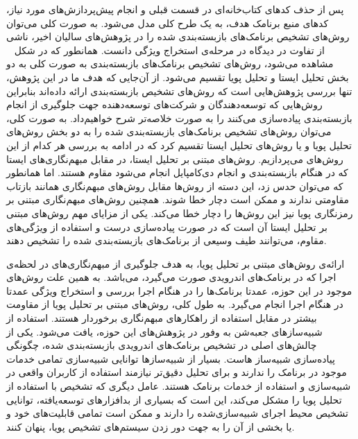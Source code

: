 پس از حذف کد‌های کتاب‌خانه‌ای در قسمت قبلی و انجام پیش‌پردازش‌های مورد نیاز، کد‌های منبع برنامک هدف، به یک طرح کلی مدل می‌شود. به صورت کلی می‌توان روش‌های تشخیص برنامک‌های بازبسته‌بندی شده را در پژوهش‌های سالیان اخیر، ناشی از تفاوت در دیدگاه در مرحله‌ی استخراج ویژگی دانست. همانطور که در شکل ~ مشاهده می‌شود، روش‌های تشخیص برنامک‌های بازبسته‌بندی به صورت کلی به دو بخش تحلیل ایستا و تحلیل پویا تقسیم می‌شود. از آن‌جایی که هدف ما در این پژوهش، تنها بررسی پژوهش‌هایی است که روش‌های تشخیص بازبسته‌بندی ارائه داده‌اند بنابراین روش‌هایی که توسعه‌دهندگان و شرکت‌های توسعه‌دهنده جهت جلوگیری از انجام بازبسته‌بندی پیاده‌سازی می‌کنند را به صورت خلاصه‌تر شرح خواهیم‌داد. به صورت کلی، می‌توان روش‌های تشخیص برنامک‌های بازبسته‌بندی شده را به دو بخش روش‌های تحلیل پویا و یا روش‌های تحلیل ایستا تقسیم کرد که در ادامه به بررسی هر کدام از این روش‌های می‌پردازیم. 
 روش‌های مبتنی بر تحلیل ایستا، در مقابل مبهم‌نگاری‌‌های ایستا که در هنگام بازبسته‌بندی و انجام دی‌کامپایل انجام می‌شود مقاوم هستند. اما همانطور که می‌توان حدس زد، این دسته از روش‌ها مقابل روش‌های مبهم‌نگاری همانند بازتاب مقاومتی ندارند و ممکن است دچار خطا شوند. همچنین روش‌های مبهم‌نگاری مبتنی بر رمز‌نگاری پویا نیز این روش‌‌ها را دچار خطا می‌کند. یکی از مزایای مهم روش‌های مبتنی بر تحلیل ایستا آن است که در صورت پیاده‌سازی درست و استفاده از ویژگی‌های مقاوم، می‌توانند طیف وسیعی از برنامک‌های بازبسته‌بندی شده را تشخیص دهند.

 ارائه‌ی روش‌های مبتنی بر تحلیل پویا، به هدف جلوگیری از مبهم‌نگاری‌های در لحظه‌ی اجرا که در برنامک‌های اندرویدی صورت می‌گیرد، می‌باشد. به همین علت روش‌های موجود در این حوزه، عمدتا برنامک‌ها را در هنگام اجرا بررسی و  استخراج ویژگی عمدتا در هنگام اجرا انجام می‌گیرد. به طول کلی، روش‌های مبتنی بر تحلیل پویا از مقاومت بیشتر در مقابل استفاده از راهکار‌های مبهم‌نگاری برخوردار هستند. استفاده از شبیه‌ساز‌های جعبه‌شن به وفور در پژوهش‌های این حوزه، یافت می‌شود. یکی از چالش‌های اصلی در تشخیص برنامک‌های اندرویدی بازبسته‌بندی شده، چگونگی پیاده‌سازی شبیه‌ساز‌ هاست. بسیار از شبیه‌سازها توانایی شبیه‌سازی تمامی خدمات موجود در برنامک‌ را ندارند و برای تحلیل دقیق‌تر نیازمند استفاده از کاربران واقعی در شبیه‌سازی و استفاده از خدمات برنامک هستند. عامل دیگری که تشخیص با استفاده از تحلیل پویا را مشکل می‌کند، این است که بسیاری از بدافزار‌های توسعه‌یافته، توانایی تشخیص محیط اجرای شبیه‌سازی‌شده را دارند و ممکن است تمامی قابلیت‌های خود و یا بخشی از آن‌ را به جهت دور زدن سیستم‌های تشخیص پویا، پنهان کنند.

